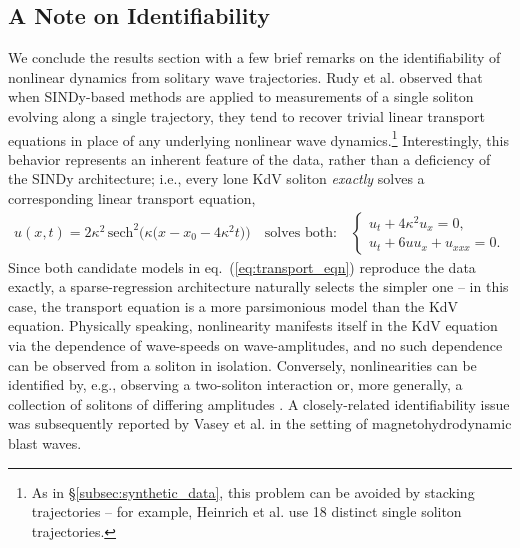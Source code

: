 \documentclass[journal=gmj]{CUP-JNL-DTM}%
\theoremstyle{definition}
\numberwithin{equation}{section}
\begin{document}
\subsection{A Note on Identifiability}\label{subsec:identifiability}
We conclude the results section with a few brief remarks on the identifiability of nonlinear dynamics from solitary wave trajectories. Rudy et al. \cite{Rudy.etal2017SciAdv} observed that when SINDy-based methods are applied to measurements of a single soliton evolving along a single trajectory, they tend to recover trivial linear transport equations in place of any underlying nonlinear wave dynamics.\footnote{As in \S\ref{subsec:synthetic_data}, this problem can be avoided by stacking trajectories -- for example, Heinrich et al. \cite{Heinrich.etal2025} use 18 distinct single soliton trajectories.} Interestingly, this behavior represents an inherent feature of the data, rather than a deficiency of the SINDy architecture; i.e., every lone KdV soliton \textit{exactly} solves a corresponding linear transport equation, \begin{align}\label{eq:transport_eqn}
    u(x,t) = 2\kappa^2\,\text{sech}^2\!\big(\kappa\big(x - x_0 - 4\kappa^2 t\big)\big)
    \quad \text{solves both:} \quad
    \begin{cases}
        u_t + 4\kappa^2 u_x = 0,
        \\
        u_t + 6uu_x + u_{xxx} = 0.
    \end{cases}
\end{align} Since both candidate models in eq.~(\ref{eq:transport_eqn}) reproduce the data exactly, a sparse-regression architecture naturally selects the simpler one -- in this case, the transport equation is a more parsimonious model than the KdV equation. Physically speaking, nonlinearity manifests itself in the KdV equation via the dependence of wave-speeds on wave-amplitudes, and no such dependence can be observed from a soliton in isolation. Conversely, nonlinearities can be identified by, e.g., observing a two-soliton interaction or, more generally, a collection of solitons of differing amplitudes \cite{Rudy.etal2017SciAdv}. A closely-related identifiability issue was subsequently reported by Vasey et al. \cite{Vasey.etal2025JournalofComputationalPhysics} in the setting of magnetohydrodynamic blast waves.

\newpage
\end{document}
